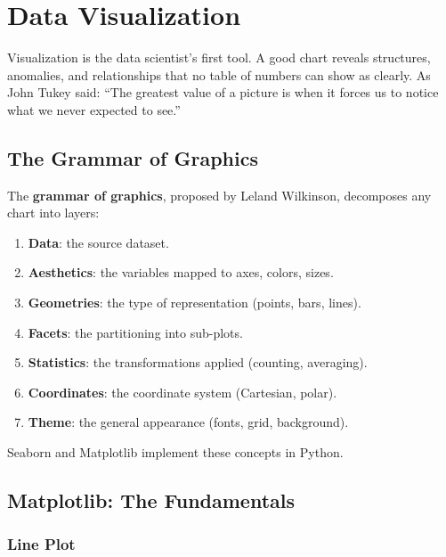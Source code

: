 \chapter{Data Visualization}
\label{ch:visualisation}

\begin{intuition}
Visualization is the data scientist's first tool. A good chart reveals structures, anomalies, and relationships that no table of numbers can show as clearly. As John Tukey said: ``The greatest value of a picture is when it forces us to notice what we never expected to see.''
\end{intuition}

\section{The Grammar of Graphics}

The \textbf{grammar of graphics}, proposed by Leland Wilkinson, decomposes any chart into layers:
\begin{enumerate}
    \item \textbf{Data}: the source dataset.
    \item \textbf{Aesthetics}: the variables mapped to axes, colors, sizes.
    \item \textbf{Geometries}: the type of representation (points, bars, lines).
    \item \textbf{Facets}: the partitioning into sub-plots.
    \item \textbf{Statistics}: the transformations applied (counting, averaging).
    \item \textbf{Coordinates}: the coordinate system (Cartesian, polar).
    \item \textbf{Theme}: the general appearance (fonts, grid, background).
\end{enumerate}

Seaborn and Matplotlib implement these concepts in Python.

\section{Matplotlib: The Fundamentals}

\subsection{Line Plot}

